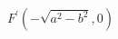 \documentclass[preview]{standalone}
\begin{document}
\begin{align*}
F^\prime(-\sqrt{a^2-b^2}, 0)
\end{align*}
\end{document}
